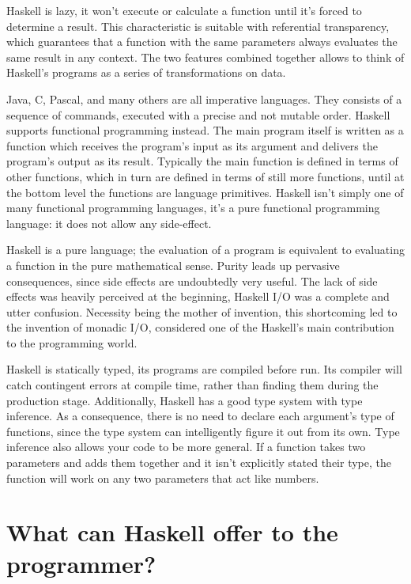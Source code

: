 \documentclass[target=mst,babel=\babelopt]{thud}[2014/01/17]
\begin{document}
Haskell is lazy, it won't execute or
calculate a function until it's forced to determine a
result. This characteristic is suitable with referential transparency,
which guarantees that a function with the same parameters always evaluates the same result
in any context. The two features combined together allows to think of
Haskell's programs as a series of transformations on data.


Java, C, Pascal, and many others are all imperative languages. They
consists of a sequence of commands, executed with a precise
and not mutable order. Haskell supports functional programming
instead. The main program itself is written as a function which receives the
program’s input as its argument and delivers the program’s output as its result.
Typically the main function is deﬁned in terms of other functions, which in
turn are deﬁned in terms of still more functions, until at the bottom level the
functions are language primitives.\cite{hughes:matters-cj} Haskell
isn't simply one of many functional programming languages, it's a pure
functional programming language: it does not allow any side-effect.

Haskell is a pure language; the evaluation of a
program is equivalent to evaluating a function in the pure
mathematical sense. Purity leads up pervasive consequences, since side
effects are undoubtedly very useful. The lack of side effects was
heavily perceived at the beginning, Haskell I/O was a complete and
utter confusion. Necessity being the mother of invention, this
shortcoming led to the invention of monadic I/O, considered one of the
Haskell's main contribution to the programming world.

Haskell is statically typed, its programs are compiled before run.
Its compiler will catch contingent errors at compile time, 
rather than finding them during the production stage. 
Additionally, Haskell has a good type system with type inference.
As a consequence, there is no need to declare each argument's type of
functions, since the type system can intelligently figure it out from
its own. Type inference also allows your code to be more general. 
If a function takes two parameters and adds them together and 
it isn't explicitly stated their type, the function will work on any two parameters that act like numbers.



\section{What can Haskell offer to the programmer?}
\end{document}
